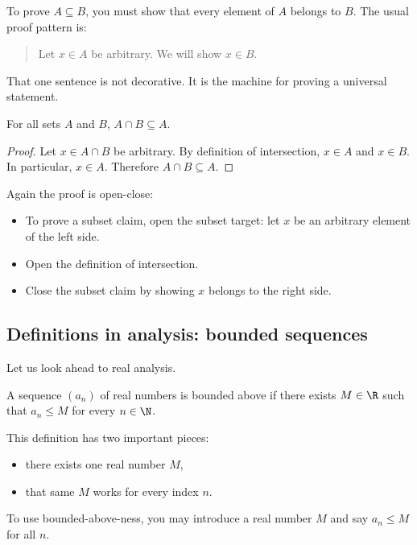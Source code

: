 To prove $A\subseteq B$, you must show that every element of $A$ belongs to $B$. The usual proof pattern is:

\begin{quote}
Let $x\in A$ be arbitrary. We will show $x\in B$.
\end{quote}

That one sentence is not decorative. It is the machine for proving a universal statement.

\begin{theorem}
For all sets $A$ and $B$, $A\cap B\subseteq A$.
\end{theorem}

\begin{proof}
Let $x\in A\cap B$ be arbitrary. By definition of intersection, $x\in A$ and $x\in B$. In particular, $x\in A$. Therefore $A\cap B\subseteq A$.
\end{proof}

Again the proof is open-close:

\begin{itemize}
\item To prove a subset claim, open the subset target: let $x$ be an arbitrary element of the left side.
\item Open the definition of intersection.
\item Close the subset claim by showing $x$ belongs to the right side.
\end{itemize}

\subsection{Definitions in analysis: bounded sequences}

Let us look ahead to real analysis.

\begin{definition}
A sequence $(a_n)$ of real numbers is bounded above if there exists $M\in\R$ such that $a_n\leq M$ for every $n\in\N$.
\end{definition}

This definition has two important pieces:

\begin{itemize}
\item there exists one real number $M$,
\item that same $M$ works for every index $n$.
\end{itemize}

To use bounded-above-ness, you may introduce a real number $M$ and say $a_n\leq M$ for all $n$.

